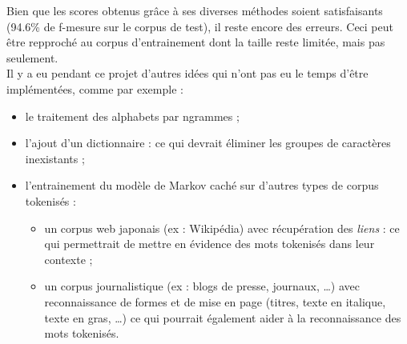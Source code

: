 
Bien que les scores obtenus grâce à ses diverses méthodes soient satisfaisants (94.6\% de f-mesure sur le corpus
de test), il reste encore des erreurs. Ceci peut être repproché au corpus d'entrainement dont la taille reste limitée, mais pas seulement.\\

Il y a eu pendant ce projet d'autres idées qui n'ont pas eu le temps d'être implémentées, comme par exemple :
\begin{itemize}
	\item le traitement des alphabets par ngrammes ;
	\item l'ajout d'un dictionnaire : ce qui devrait éliminer les groupes de caractères inexistants ;
	\item l'entrainement du modèle de Markov caché sur d'autres types de corpus tokenisés :
	\begin{itemize}
		\item un corpus web japonais (ex : Wikipédia) avec récupération des \textit{liens} : ce qui permettrait de mettre en évidence des mots tokenisés dans leur contexte ;
		\item un corpus journalistique (ex : blogs de presse, journaux, \dots) avec reconnaissance de formes et de mise en page (titres, texte en italique, texte en gras, \dots ) ce qui pourrait également aider à la reconnaissance des mots tokenisés.
		\end{itemize}
\end{itemize}  
